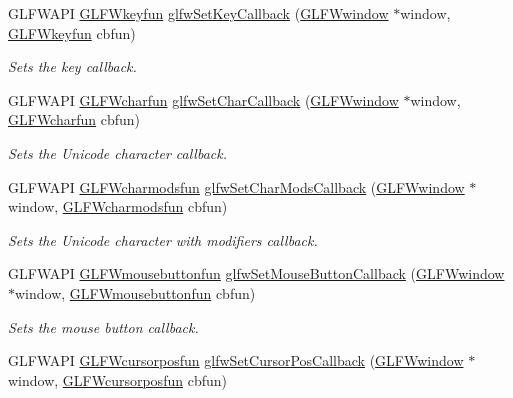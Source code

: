 \begin{DoxyCompactItemize}
G\+L\+F\+W\+A\+PI \hyperlink{group__input_ga0192a232a41e4e82948217c8ba94fdfd}{G\+L\+F\+Wkeyfun} \hyperlink{group__input_gaa73bb92f628a2a0be9c132d56f19362c}{glfw\+Set\+Key\+Callback} (\hyperlink{group__window_ga3c96d80d363e67d13a41b5d1821f3242}{G\+L\+F\+Wwindow} $\ast$window, \hyperlink{group__input_ga0192a232a41e4e82948217c8ba94fdfd}{G\+L\+F\+Wkeyfun} cbfun)
\begin{DoxyCompactList}\small\item\em Sets the key callback. \end{DoxyCompactList}\item 
G\+L\+F\+W\+A\+PI \hyperlink{group__input_gabf24451c7ceb1952bc02b17a0d5c3e5f}{G\+L\+F\+Wcharfun} \hyperlink{group__input_ga07b2959b23dc3e466ce7475746021002}{glfw\+Set\+Char\+Callback} (\hyperlink{group__window_ga3c96d80d363e67d13a41b5d1821f3242}{G\+L\+F\+Wwindow} $\ast$window, \hyperlink{group__input_gabf24451c7ceb1952bc02b17a0d5c3e5f}{G\+L\+F\+Wcharfun} cbfun)
\begin{DoxyCompactList}\small\item\em Sets the Unicode character callback. \end{DoxyCompactList}\item 
G\+L\+F\+W\+A\+PI \hyperlink{group__input_gae36fb6897d2b7df9b128900c8ce9c507}{G\+L\+F\+Wcharmodsfun} \hyperlink{group__input_gae6eee0bda7429bfe8028615847cf6795}{glfw\+Set\+Char\+Mods\+Callback} (\hyperlink{group__window_ga3c96d80d363e67d13a41b5d1821f3242}{G\+L\+F\+Wwindow} $\ast$window, \hyperlink{group__input_gae36fb6897d2b7df9b128900c8ce9c507}{G\+L\+F\+Wcharmodsfun} cbfun)
\begin{DoxyCompactList}\small\item\em Sets the Unicode character with modifiers callback. \end{DoxyCompactList}\item 
G\+L\+F\+W\+A\+PI \hyperlink{group__input_ga39893a4a7e7c3239c98d29c9e084350c}{G\+L\+F\+Wmousebuttonfun} \hyperlink{group__input_ga20e5ba1ce4e086aedd48a06dc311c95f}{glfw\+Set\+Mouse\+Button\+Callback} (\hyperlink{group__window_ga3c96d80d363e67d13a41b5d1821f3242}{G\+L\+F\+Wwindow} $\ast$window, \hyperlink{group__input_ga39893a4a7e7c3239c98d29c9e084350c}{G\+L\+F\+Wmousebuttonfun} cbfun)
\begin{DoxyCompactList}\small\item\em Sets the mouse button callback. \end{DoxyCompactList}\item 
G\+L\+F\+W\+A\+PI \hyperlink{group__input_ga4cfad918fa836f09541e7b9acd36686c}{G\+L\+F\+Wcursorposfun} \hyperlink{group__input_ga9c49c0d3d3c775c3124726f1d902124d}{glfw\+Set\+Cursor\+Pos\+Callback} (\hyperlink{group__window_ga3c96d80d363e67d13a41b5d1821f3242}{G\+L\+F\+Wwindow} $\ast$window, \hyperlink{group__input_ga4cfad918fa836f09541e7b9acd36686c}{G\+L\+F\+Wcursorposfun} cbfun)

\end{DoxyCompactItemize}
